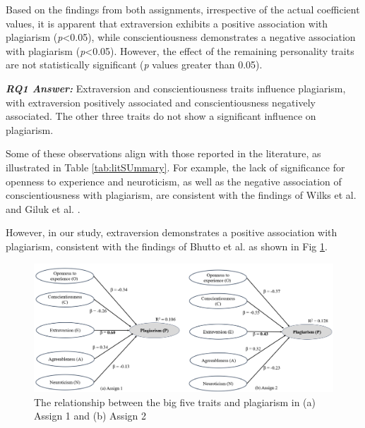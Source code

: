 Based on the findings from both assignments, irrespective of the actual coefficient values, it is apparent that extraversion exhibits a positive association with plagiarism (\textit{p}<0.05), while conscientiousness demonstrates a negative association with plagiarism (\textit{p}<0.05). However, the effect of the remaining personality traits are not statistically significant (\textit{p} values greater than 0.05).

\vspace{8pt}
\begin{mdframed}
\textbf{\textit{RQ1 Answer:}} Extraversion and conscientiousness traits influence plagiarism, with extraversion positively associated and conscientiousness negatively associated. The other three traits do not show a significant influence on plagiarism. 
\end{mdframed}
\vspace{8pt}

Some of these observations align with those reported in the literature, as illustrated in Table \ref{tab:litSUmmary}. For example, the lack of significance for openness to experience and neuroticism, as well as the negative association of conscientiousness with plagiarism, are consistent with the findings of Wilks et al. \cite{Wilks2016-WILPTA-3} and Giluk et al. \cite{Giluk2015BigFP}. 

However, in our study, extraversion demonstrates a positive association with plagiarism, consistent with the findings of Bhutto et al. \cite{Bhutto2019ACS} as shown in Fig \ref{fig:personalityAndPlagiarism}. 

\begin{figure}[H]
  \centering
  \includegraphics[width=\columnwidth]{1.png}
  \caption{The relationship between the big five traits and plagiarism in (a) Assign 1 and (b) Assign 2}
  \label{fig:personalityAndPlagiarism}\vspace{-4pt}
\end{figure}

